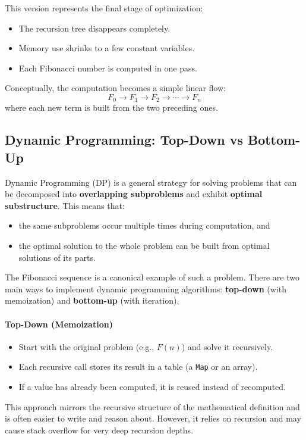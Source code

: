 \documentclass{article}
\begin{document}
This version represents the final stage of optimization:
\begin{itemize}
	\item The recursion tree disappears completely.
	\item Memory use shrinks to a few constant variables.
	\item Each Fibonacci number is computed in one pass.
\end{itemize}

Conceptually, the computation becomes a simple linear flow:
\[
	F_0 \rightarrow F_1 \rightarrow F_2 \rightarrow \cdots \rightarrow F_n
\]
where each new term is built from the two preceding ones.

\subsection{Dynamic Programming: Top-Down vs Bottom-Up}

Dynamic Programming (DP) is a general strategy for solving problems that can be decomposed into
\textbf{overlapping subproblems} and exhibit \textbf{optimal substructure}.
This means that:
\begin{itemize}
	\item the same subproblems occur multiple times during computation, and
	\item the optimal solution to the whole problem can be built from optimal solutions of its parts.
\end{itemize}

The Fibonacci sequence is a canonical example of such a problem.
There are two main ways to implement dynamic programming algorithms:
\textbf{top-down} (with memoization) and \textbf{bottom-up} (with iteration).
\paragraph{Top-Down (Memoization)}
\begin{itemize}
	\item Start with the original problem (e.g., $F(n)$) and solve it recursively.
	\item Each recursive call stores its result in a table (a \texttt{Map} or an array).
	\item If a value has already been computed, it is reused instead of recomputed.
\end{itemize}
This approach mirrors the recursive structure of the mathematical definition and is often easier to write and reason about.
However, it relies on recursion and may cause stack overflow for very deep recursion depths.
\end{document}
